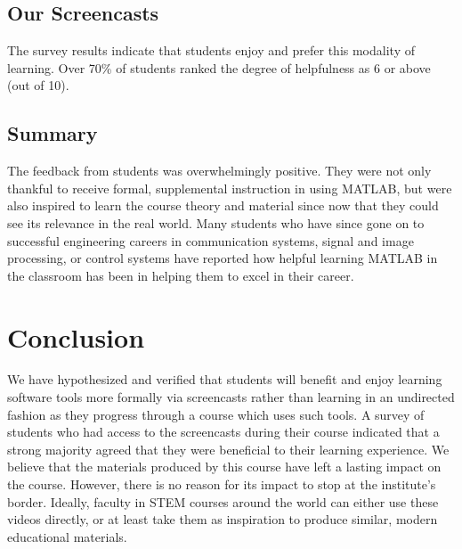 \documentclass[a4paper,10pt]{article}
\begin{document}
\subsection{Our Screencasts}
The survey results indicate that students enjoy and prefer this modality of learning. Over 70\% of students ranked the degree of helpfulness as 6 or above (out of 10).

\subsection{Summary}
The feedback from students was overwhelmingly positive.  They were not only thankful to receive formal, supplemental instruction in using MATLAB, but were also inspired to learn the course theory and material since now that they could see its relevance in the real world.  Many students who have since gone on to successful engineering careers in communication systems, signal and image processing, or control systems have reported how helpful learning MATLAB in the classroom has been in helping them to excel in their career.


\section{Conclusion}
We have hypothesized and verified that students will benefit and enjoy learning software tools more formally via screencasts rather than learning in an undirected fashion as they progress through a course which uses such tools.  A survey of students who had access to the screencasts during their course indicated that a strong majority agreed that they were beneficial to their learning experience. We believe that the materials produced by this course have left a lasting impact on the course. However, there is no reason for its impact to stop at the institute's border. Ideally, faculty in STEM courses around the world can either use these videos directly, or at least take them as inspiration to produce similar, modern educational materials.  

 

\end{document}
